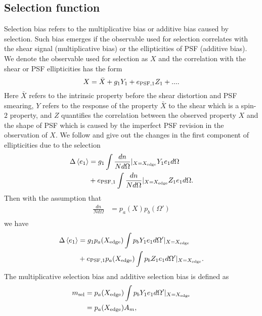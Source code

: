 \subsection{Selection function}
\label{sec_Method_select}
Selection bias refers to the multiplicative bias or additive bias caused by
selection. Such bias emerges if the observable used for selection correlates
with the shear signal (multiplicative bias) or the ellipticities of PSF
(additive bias).
We denote the observable used for selection as $X$ and the correlation with the
shear or PSF ellipticities has the form
\begin{equation}
X=\bar{X}+g_1Y_1+e_{\rm{PSF,1}}Z_1+....
\end{equation}
Here $\bar{X}$ refers to the intrinsic property before the shear distortion and
PSF smearing, $Y$ refers to the response of the property $\bar{X}$ to the shear
which is a spin-$2$ property, and $Z$ quantifies the correlation between the
observed property $X$ and the shape of PSF which is caused by the imperfect PSF
revision in the observation of $X$. We follow \citet{HSC1-GREAT3Sim} and give
out the changes in the first component of ellipticities due to the selection
\begin{equation}
\begin{split}
\Delta \left\langle e_1\right \rangle  &= g_1\int \frac{dn}{Nd\Omega } |_{X=X_{\rm{edge}}} Y_1 e_1 d\Omega \\
        &+ e_{\rm{PSF,1}} \int \frac{dn}{Nd\Omega}|_{X=X_{\rm{edge}}} Z_1 e_1 d\Omega.
\end{split}
\end{equation}
Then with the assumption that
\begin{equation}
\begin{split}
 \frac{dn}{Nd\Omega}&=p_a(X)p_b(\Omega')\\
\end{split}
\end{equation}
we have
\begin{equation}
\begin{split}
\Delta \left\langle e_1\right \rangle  &= g_1p_a(X_{\rm{edge}})\int p_b Y_1 e_1
d\Omega'|_{X=X_{\rm{edge}}} \\ &+ e_{\rm{PSF,1}} p_a(X_{\rm{edge}}) \int p_b
Z_1 e_1 d\Omega'|_{X=X_{\rm{edge}}} .
\end{split}
\end{equation}
The multiplicative selection bias and additive selection bias is defined as
\begin{equation}
\begin{split}
m_{\rm{sel}}&=p_a(X_{\rm{edge}})\int p_b Y_1 e_1 d\Omega'|_{X=X_{\rm{edge}}} \\
            &=p_a(X_{\rm{edge}}) A_m,\\
\end{split}
\end{equation}


